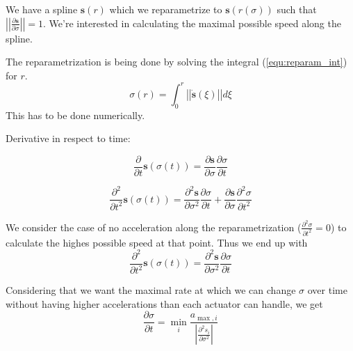 \documentclass[11pt,onecolumn,a4paper,oneside,openright,final]{article}
\begin{document}
We have a spline $\mathbf{s}\left( r \right)$ which we reparametrize to $\mathbf{s}\left( r \left( \sigma \right) \right)$ such that $\left| \left| \frac{\partial \mathbf{s}}{\partial \sigma} \right| \right| = 1$.
We're interested in calculating the maximal possible speed along the spline.

The reparametrization is being done by solving the integral (\ref{equ:reparam_int}) for $r$.
\begin{equation}
    \sigma \left( r \right) = \int_0^r{\left| \left| \dot{\mathbf{s}} \left( \xi \right) \right| \right| d\xi}    
    \label{equ:reparam_int}
\end{equation}
This has to be done numerically.


Derivative in respect to time:

\begin{equation}
    \frac{\partial}{\partial t} \mathbf{s} \left( \sigma \left( t \right) \right) =
    \frac{\partial \mathbf{s}}{\partial \sigma} \frac{\partial \sigma}{\partial t} 
    \label{equ:s_dot}
\end{equation}

\begin{equation}
    \frac{\partial^2}{\partial t^2} \mathbf{s} \left( \sigma \left( t \right) \right) =
    \frac{\partial^2 \mathbf{s}}{\partial \sigma^2} \frac{\partial \sigma}{\partial t} +
    \frac{\partial \mathbf{s}}{\partial \sigma} \frac{\partial^2 \sigma}{\partial t^2} 
    \label{equ:s_dot_dot}
\end{equation}

We consider the case of no acceleration along the reparametrization ($\frac{\partial^2 \sigma}{\partial t^2} = 0$) to calculate the highes possible speed at that point.
Thus we end up with
\begin{equation}
    \frac{\partial^2}{\partial t^2} \mathbf{s} \left( \sigma \left( t \right) \right) =
    \frac{\partial^2 \mathbf{s}}{\partial \sigma^2} \frac{\partial \sigma}{\partial t}
    \label{equ:s_dot_dot_no_acc}
\end{equation}

Considering that we want the maximal rate at which we can change $\sigma$ over time without having higher accelerations than each actuator can handle, we get
\begin{equation}
    \frac{\partial \sigma}{\partial t} =
    \min_i{\frac{a_{\max,i}}{\left|\frac{\partial^2 s_i}{\partial \sigma^2}\right|}}
    \label{equ:max_speed}
\end{equation}
\end{document}
